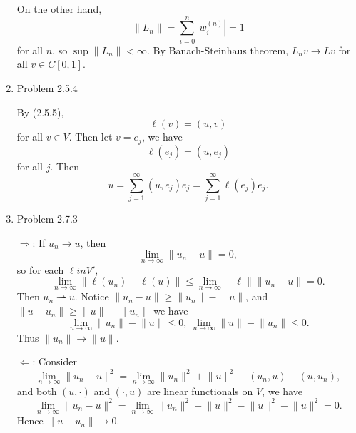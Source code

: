 \documentclass{article}%
\newcommand{\lv}{\lVert}
\newcommand{\rv}{\rVert}
\begin{document}
\begin{enumerate}
On the other hand, 
\begin{equation}
\lv L_n\rv = \sum_{i=0}^{n}|w_i^{(n)}| = 1
\end{equation}
for all $n$, so $\sup \lv L_n\rv < \infty $. By Banach-Steinhaus theorem, $L_n v\to Lv $ for all $v\in C[0, 1]$.

\item Problem 2.5.4

By (2.5.5),
\begin{equation}
\ell(v) = (u, v)
\end{equation}
for all $v\in V$. Then let $v = e_j $, we have
\begin{equation}
\ell(e_j) = (u, e_j)
\end{equation}
for all $j$. Then
\begin{equation}
u = \sum_{j=1}^{\infty}(u, e_j)e_j = \sum_{j=1}^{\infty}\ell(e_j)e_j.
\end{equation}

\item Problem 2.7.3

$\Rightarrow$: If $u_n \to u $, then
\begin{equation}
\lim_{n\to\infty} \lv u_n - u\rv = 0,
\end{equation}
so for each $\ell in V'$, 
\begin{equation}
\lim_{n\to\infty}\lv \ell(u_n) - \ell(u)\rv \le\lim_{n\to\infty}\lv \ell\rv \lv u_n-u\rv = 0.
\end{equation}
Then $u_n \rightharpoonup u $. Notice $\lv u_n-u\rv \ge \lv u_n\rv - \lv u\rv $, and $\lv u - u_n\rv \ge \lv u\rv - \lv u_n\rv $ we have
\begin{equation}
\lim_{n\to\infty}\lv u_n\rv - \lv u\rv \le 0, \ \lim_{n\to\infty} \lv u \rv - \lv u_n\rv \le 0.
\end{equation}
Thus $\lv u_n\rv \to \lv u\rv $.

$\Leftarrow$: Consider
\begin{equation}
\lim_{n\to\infty}\lv u_n-u\rv^2 = \lim_{n\to\infty}\lv u_n\rv^2 + \lv u\rv^2 - (u_n, u) - (u, u_n),
\end{equation}
and both $(u, \cdot)$ and $(\cdot, u)$ are linear functionals on $V$, we have
\begin{equation}
\lim_{n\to\infty}\lv u_n - u\rv^2 = \lim_{n\to\infty} \lv u_n\rv^2 + \lv u\rv^2 - \lv u\rv^2 - \lv u\rv^2 = 0.
\end{equation}
Hence $\lv u - u_n\rv \to 0 $.

\end{enumerate}
\end{document}
